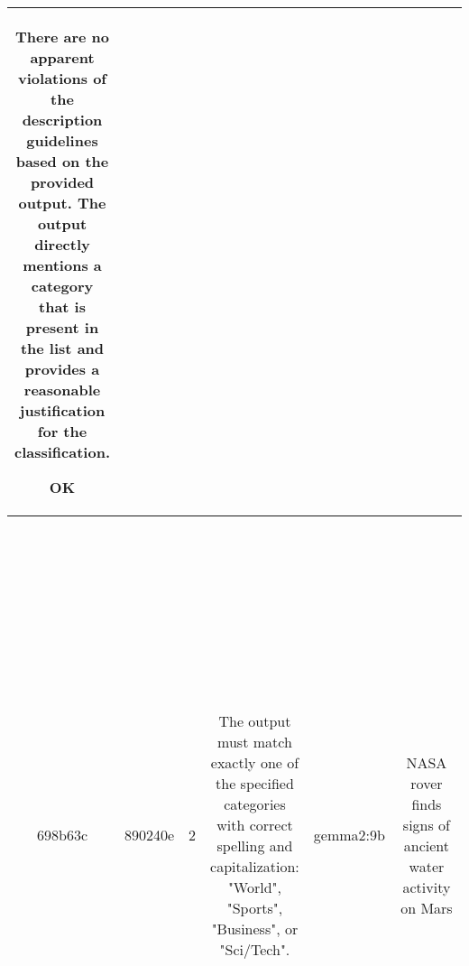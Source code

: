 \begin{table}[h!]
\begin{tabular}{|c|c|c|c|c|c|c|c|c|c|}
There are no apparent violations of the description guidelines based on the provided output. The output directly mentions a category that is present in the list and provides a reasonable justification for the classification.

OK & \\
\hline
698b63c & 890240e & 2 & The output must match exactly one of the specified categories with correct spelling and capitalization: "World", "Sports", "Business", or "Sci/Tech". & gemma2:9b & NASA rover finds signs of ancient water activity on Mars & This article belongs to the **Sci/Tech** category. 

Here's why:

* It deals with a scientific discovery (signs of ancient water activity).
* It involves space exploration and technology (NASA rover). 


Let me know if you have any other articles you'd like classified!  
 & ok & No violation. 
OK & \\
\hline
ea3d855 & 890240e & 2 & The output must match exactly one of the specified categories with correct spelling and capitalization: "World", "Sports", "Business", or "Sci/Tech". & gemma2:9b & World leaders discuss actions on global warming & This article would be classified as **World**. 

Here's why:

* **Subject Matter:** The topic focuses on international cooperation and policy regarding a global issue (climate change). This aligns directly with the scope of "World" news.


Let me know if you have any other articles you'd like me to classify! 
 & ok & The chatbot output complies with the required task as per the description. According to the guidelines, the chatbot is expected to classify a news article into one of the specified categories: World, Sports, Business, Sci/Tech. The output clearly identifies "World" as the category for the given article, which matches one of the provided categories. Additionally, it provides reasoning that relates to the context of "World" news by discussing "international cooperation and policy regarding a global issue (climate change)," which is congruent with the type of example mentioned under the "World" category in the chatbot description. There are no other elements or sections in the output that violate the given description. 

Thus, there is no violation of compliance with the information provided in the chatbot description.


\end{tabular}
\end{table}
